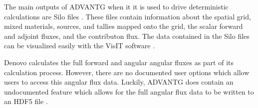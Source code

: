 The main outputs of ADVANTG when it it is used to drive deterministic calculations are Silo files \cite{silo}.
These files contain information about the spatial grid, mixed materials, sources, and tallies mapped onto the grid, the scalar forward and adjoint fluxes, and the contributon flux.
The data contained in the Silo files can be visualized easily with the VisIT software \cite{visit}.

Denovo calculates the full forward and angular angular fluxes as part of its calculation process.
However, there are no documented user options which allow users to access this angular flux data.
Luckily, ADVANTG does contain an undocumented feature which allows for the full angular flux data to be written to an HDF5 file \cite{hdf5}.
